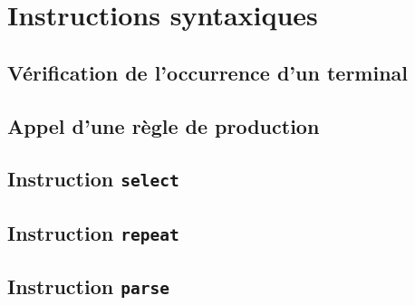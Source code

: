 
\chapter{Instructions syntaxiques}



\section{Vérification de l'occurrence d'un terminal}






\section{Appel d'une règle de production}





\section{Instruction \texttt{select}}








\section{Instruction \texttt{repeat}}







\section{Instruction \texttt{parse}}




